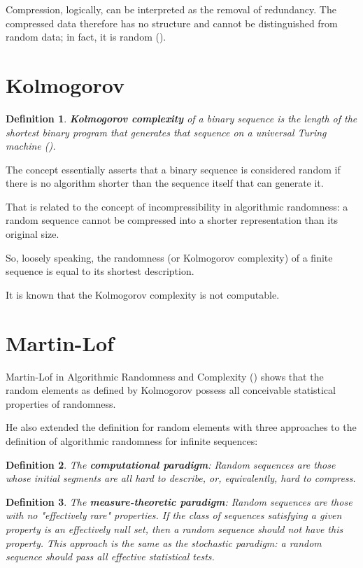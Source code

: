 \documentclass[12pt, a4paper]{report}
\newtheorem{definition}{Definition}[section] %
\begin{document}
Compression, logically, can be interpreted as the removal of redundancy. The compressed data therefore has no structure and cannot
be distinguished from random data; in fact, it is random (\cite{AConciseIntroductionToDataCompression}).

\section{Kolmogorov}

\begin{definition}
\textbf{Kolmogorov complexity} of a binary sequence is the length of the shortest binary program that generates that sequence on a
universal Turing machine (\cite{ThreeApproachesToTheQuantitativeDefinitionOfInformation}).
\end{definition}

The concept essentially asserts that a binary sequence is considered random if there is no algorithm shorter than the sequence
itself that can generate it.

That is related to the concept of incompressibility in algorithmic randomness: a random sequence cannot be compressed into a
shorter representation than its original size.

So, loosely speaking, the randomness (or Kolmogorov complexity) of a finite sequence is equal to its shortest description.

It is known that the Kolmogorov complexity is not computable.

\section{Martin-Lof}

Martin-Lof in Algorithmic Randomness and Complexity (\cite{TheDefinitionOfRandomSequences}) shows that the random elements as
defined by Kolmogorov possess all conceivable statistical properties of randomness.

He also extended the definition for random elements with three approaches to the definition of algorithmic randomness for infinite
sequences:

\begin{definition}
The \textbf{computational paradigm}: Random sequences are those whose initial segments are all hard  to describe, or,
equivalently, hard to compress.
\end{definition}

\begin{definition}
The \textbf{measure-theoretic paradigm}: Random sequences  are those with no "effectively rare" properties. If the class of
sequences satisfying a given property is an effectively null set, then a random sequence should not have this property.
This approach is the same as the stochastic paradigm: a random sequence should pass all effective statistical tests.
\end{definition}
\end{document}
